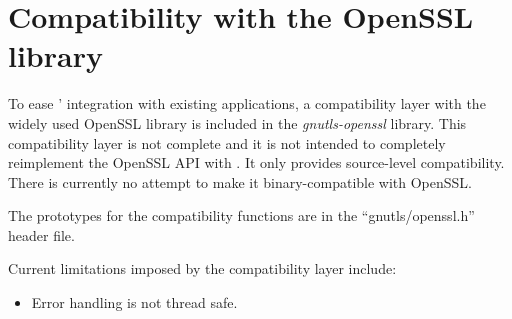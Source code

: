 \section{Compatibility with the OpenSSL library}

To ease \gnutls{}' integration with existing applications, a compatibility 
layer with the widely used OpenSSL library is included in the \emph{gnutls-openssl}
library. This compatibility layer is not complete and it is not 
intended to completely reimplement the OpenSSL API with \gnutls{}.
It only provides source-level compatibility. There is currently no
attempt to make it binary-compatible with OpenSSL.
\par
The prototypes for the compatibility functions are in the 
``gnutls/openssl.h'' header file. 

Current limitations imposed by the compatibility layer include:

\begin{itemize}

\item Error handling is not thread safe.

\end{itemize}

